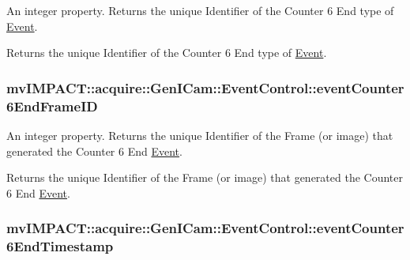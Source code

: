 An integer property. Returns the unique Identifier of the Counter 6 End type of \hyperlink{classmv_i_m_p_a_c_t_1_1acquire_1_1_event}{Event}. 

Returns the unique Identifier of the Counter 6 End type of \hyperlink{classmv_i_m_p_a_c_t_1_1acquire_1_1_event}{Event}. \hypertarget{classmv_i_m_p_a_c_t_1_1acquire_1_1_gen_i_cam_1_1_event_control_a6dfa5af384da606cdb873710cb35dd32}{
\subsubsection[{event\+Counter6\+End\+Frame\+I\+D}]{ mv\+I\+M\+P\+A\+C\+T\+::acquire\+::\+Gen\+I\+Cam\+::\+Event\+Control\+::event\+Counter6\+End\+Frame\+I\+D}}\label{classmv_i_m_p_a_c_t_1_1acquire_1_1_gen_i_cam_1_1_event_control_a6dfa5af384da606cdb873710cb35dd32}


An integer property. Returns the unique Identifier of the Frame (or image) that generated the Counter 6 End \hyperlink{classmv_i_m_p_a_c_t_1_1acquire_1_1_event}{Event}. 

Returns the unique Identifier of the Frame (or image) that generated the Counter 6 End \hyperlink{classmv_i_m_p_a_c_t_1_1acquire_1_1_event}{Event}. \hypertarget{classmv_i_m_p_a_c_t_1_1acquire_1_1_gen_i_cam_1_1_event_control_ab5bc3309793bc41fe1530e1408aac163}{
\subsubsection[{event\+Counter6\+End\+Timestamp}]{ mv\+I\+M\+P\+A\+C\+T\+::acquire\+::\+Gen\+I\+Cam\+::\+Event\+Control\+::event\+Counter6\+End\+Timestamp}}\label{classmv_i_m_p_a_c_t_1_1acquire_1_1_gen_i_cam_1_1_event_control_ab5bc3309793bc41fe1530e1408aac163}


